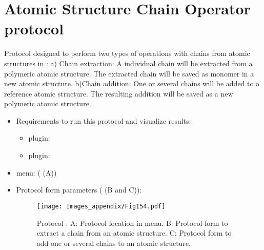 \section{Atomic Structure Chain Operator protocol}
\label{app:atomStructUtilsOperatorProtocol}%
Protocol designed to perform two types of operations with chains from atomic structures in \scipion: a) Chain extraction: A individual chain will be extracted from a polymeric atomic structure. The extracted chain will be saved as monomer in a new atomic structure. b)Chain addition: One or several chains will be added to a reference atomic structure. The resulting addition will be saved as a new polymeric atomic structure. 

\begin{itemize}
 \item Requirements to run this protocol and visualize results:
    \begin{itemize}
        \item \scipion plugin: 
        \item \scipion plugin: 
    \end{itemize}
 \item \scipion menu:
   ( (A))
  
 \item Protocol form parameters ( (B and C)):
 
 \begin{figure}[H]
     \centering 
     \captionsetup{width=.7\linewidth} 
     \texttt{[image: Images\_appendix/Fig154.pdf]}
     \caption{Protocol . A: Protocol location in \scipion menu. B: Protocol form to extract a chain from an atomic structure. C: Protocol form to add one or several chains to an atomic structure.}
     \label{fig:app_protocol_atomstructutils_operator_1}
    \end{figure}
    

\end{itemize}
